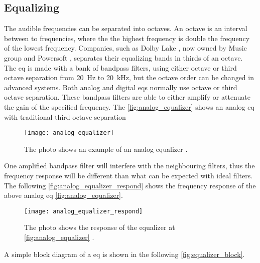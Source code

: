 \subsection{Equalizing}
The audible frequencies can be separated into octaves. An octave is an interval between to frequencies, where the the highest frequency is double the frequency of the lowest frequency. Companies, such as Dolby Lake \citep{lab_gruppen_eq}, now owned by Music group and Powersoft \citep{powersoft_eq}, separates their equalizing bands in thirds of an octave. 
The \gls{eq} is made with a bank of bandpass filters, using either octave or third octave separation from \SI{20}{\hertz} to \SI{20}{\kilo\hertz}, but the octave order can be changed in advanced systems. Both analog and digital \gls{eq}s normally use octave or third octave separation. These bandpass filters are able to either amplify or attenuate the gain of the specified frequency. The \autoref{fig:analog_equalizer} shows an analog \gls{eq} with traditional third octave separation \citep{nordic}

\begin{figure} [htbp]
 \centering
  \texttt{[image: analog\_equalizer]}
  \caption{The photo shows an example of an analog equalizer \citep{nordic}.}
  \label{fig:analog_equalizer}
\end{figure}

One amplified bandpass filter will interfere with the neighbouring filters, thus the frequency response will be different than what can be expected with ideal filters. The following \autoref{fig:analog_equalizer_respond} shows the frequency response of the above analog \gls{eq} \autoref{fig:analog_equalizer}.

\begin{figure} [htbp]
 \centering
  \texttt{[image: analog\_equalizer\_respond]}
  \caption{The photo shows the response of the equalizer at \autoref{fig:analog_equalizer} \citep{nordic}.}
  \label{fig:analog_equalizer_respond}
\end{figure}

A simple block diagram of a \gls{eq}  is shown in the following \autoref{fig:equalizer_block}.

